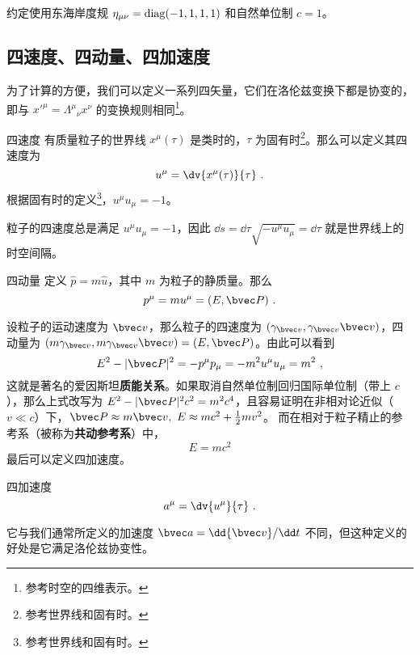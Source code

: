 

约定使用东海岸度规 $\eta_{\mu\nu}=\rm{diag}(-1,1,1,1)$ 和自然单位制 $c=1$。

\subsection{四速度、四动量、四加速度}
为了计算的方便，我们可以定义一系列四矢量，它们在洛伦兹变换下都是协变的，即与 $x'^\mu=\Lambda^\mu{}_\nu x^\nu$ 的变换规则相同\footnote{参考时空的四维表示。}。

\begin{definition}{四速度}
有质量粒子的世界线 $x^\mu(\tau)$ 是类时的，$\tau$ 为固有时\footnote{参考世界线和固有时。}。那么可以定义其四速度为
\begin{equation}
u^\mu = \dv{x^\mu(\tau)}{\tau}~.
\end{equation}
根据固有时的定义\footnote{参考世界线和固有时。}，$u^\mu u_\mu = -1$。
\end{definition}
粒子的四速度总是满足 $u^\mu u_\mu = -1$，因此 $\dd s = \dd \tau \sqrt{- u^\mu u_\mu} = \dd \tau$ 就是世界线上的时空间隔。

\begin{definition}{四动量}
定义 $\hat p=m\hat u$，其中 $m$ 为粒子的静质量。那么
\begin{equation}
p^\mu = m u^\mu = (E,\bvec P)~.
\end{equation}
\end{definition}
设粒子的运动速度为 $\bvec v$，那么粒子的四速度为 $(\gamma_{\bvec v},\gamma_{\bvec v}\bvec v)$，四动量为 $(m\gamma_{\bvec v}, m\gamma_{\bvec v} \bvec v)=(E,\bvec P)$。由此可以看到
\begin{equation}
E^2-|\bvec P|^2=-p^\mu p_\mu=-m^2 u^\mu u_\mu = m^2~,
\end{equation}
这就是著名的爱因斯坦\textbf{质能关系}。如果取消自然单位制回归国际单位制（带上 $c$），那么上式改写为 $E^2-|\bvec P|^2c^2=m^2c^4$，且容易证明在非相对论近似（$v\ll c$）下，$\bvec P\approx m\bvec v,\ E\approx mc^2+\frac{1}{2}mv^2$。
而在相对于粒子精止的参考系（被称为\textbf{共动参考系}）中，
\begin{equation}
E=mc^2
\end{equation}
最后可以定义四加速度。
\begin{definition}{四加速度}
\begin{equation}
a^\mu = \dv{u^\mu}{\tau}~.
\end{equation}
\end{definition}
它与我们通常所定义的加速度 $\bvec a=\dd {\bvec v}/\dd t$ 不同，但这种定义的好处是它满足洛伦兹协变性。